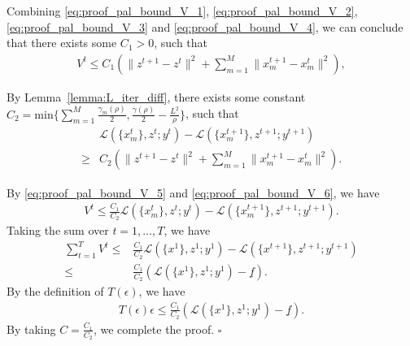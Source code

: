 Combining \eqref{eq:proof_pal_bound_V_1}, \eqref{eq:proof_pal_bound_V_2}, \eqref{eq:proof_pal_bound_V_3} and \eqref{eq:proof_pal_bound_V_4}, we can conclude that there exists some $C_1>0$, such that
\begin{align}
    V^t \le C_1(\|z^{t+1}-z^t\|^2 + \sum_{m=1}^M\|x_m^{t+1}-x_m^t\|^2), \label{eq:proof_pal_bound_V_5}
\end{align}

By Lemma~\ref{lemma:L_iter_diff}, there exists some constant $C_2 = \text{min}\{\sum_{m=1}^M\frac{\gamma_m(\rho)}{2}, \frac{\gamma(\rho)}{2} - \frac{L^2}{\rho}\}$, such that
\begin{align}
    & \mathcal{L}(\{x_m^t\}, z^t; y^t) - \mathcal{L}(\{x_m^{t+1}\}, z^{t+1}; y^{t+1})\nonumber\\
    \ge & C_2 (\|z^{t+1}-z^t\|^2 + \sum_{m=1}^M\|x_m^{t+1}-x_m^t\|^2). \label{eq:proof_pal_bound_V_6}
\end{align}

By \eqref{eq:proof_pal_bound_V_5} and \eqref{eq:proof_pal_bound_V_6}, we have
\begin{align}
    V^t\le \frac{C_1}{C_2}\mathcal{L}(\{x_m^t\}, z^t; y^t) - \mathcal{L}(\{x_m^{t+1}\}, z^{t+1}; y^{t+1}).
\end{align}
Taking the sum over $t=1,\ldots, T$, we have
\begin{align}
    \sum_{t=1}^T V^t \le & \frac{C_1}{C_2} \mathcal{L}(\{x^1\}, z^1; y^1) - \mathcal{L}(\{x^{t+1}\}, z^{t+1}; y^{t+1})\nonumber\\
    \le & \frac{C_1}{C_2} (\mathcal{L}(\{x^1\}, z^1; y^1) - \underline{f}).
\end{align}
By the definition of $T(\epsilon)$, we have
\begin{align}
    T(\epsilon)\epsilon \le \frac{C_1}{C_2} (\mathcal{L}(\{x^1\}, z^1; y^1)  - \underline{f}).
\end{align}
By taking $C = \frac{C_1}{C_2}$, we complete the proof. \hfill$\square$

